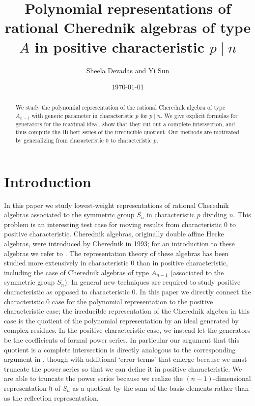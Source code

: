 \documentclass{article}
\title{Polynomial representations of rational Cherednik algebras of type $A$ in positive characteristic $p \mid n$}
\author{Sheela Devadas and Yi Sun}
\date{\today}
\numberwithin{equation}{section}
\newcommand{\h}{\mathfrak{h}}
\begin{document}
\maketitle

\begin{abstract}
We study the polynomial representation of the rational Cherednik algebra of type $A_{n-1}$ with generic parameter in characteristic $p$ for $p \mid n$. We give explicit formulas for generators for the maximal ideal, show that they cut out a complete intersection, and thus compute the Hilbert series of the irreducible quotient. Our methods are motivated by generalizing from characteristic $0$ to characteristic $p$. \end{abstract}

\section{Introduction}

In this paper we study lowest-weight representations of rational Cherednik algebras associated to the symmetric group $S_n$ in characteristic $p$ dividing $n$. This problem is an interesting test case for moving results from characteristic $0$ to positive characteristic. Cherednik algebras, originally double affine Hecke algebras, were introduced by Cherednik in 1993; for an introduction to these algebras we refer to \cite{EM}. The representation theory of these algebras has been studied more extensively in characteristic $0$ than in positive characteristic, including the case of Cherednik algebras of type $A_{n-1}$ (associated to the symmetric group $S_n$). In general new techniques are required to study positive characteristic as opposed to characteristic 0. In this paper we directly connect the characteristic 0 case for the polynomial representation to the positive characteristic case; the irreducible representation of the Cherednik algebra in this case is the quotient of the polynomial representation by an ideal generated by complex residues. In the positive characteristic case, we instead let the generators be the coefficients of formal power series. In particular our argument that this quotient is a complete intersection is directly analogous to the corresponding argument in \cite{CE}, though with additional `error terms' that emerge because we must truncate the power series so that we can define it in positive characteristic. We are able to truncate the power series because we realize the $(n-1)$-dimensional representation $\h$ of $S_n$ as a quotient by the sum of the basis elements rather than as the reflection representation.
\end{document}
